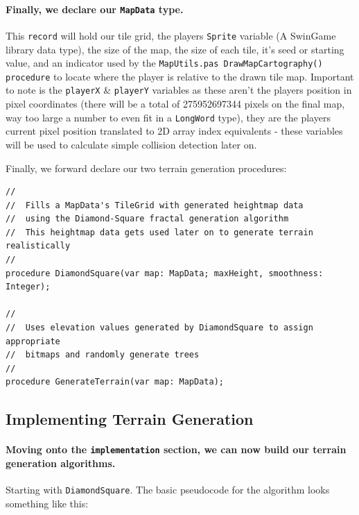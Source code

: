 \documentclass{article}
\begin{document}
\paragraph{Finally, we declare our \texttt{MapData} type.} This \texttt{record} will hold our tile grid, the players \texttt{Sprite} variable (A SwinGame library data type), the size of the map, the size of each tile, it's seed or starting value, and an indicator used by the \texttt{MapUtils.pas DrawMapCartography() procedure} to locate where the player is relative to the drawn tile map. Important to note is the \texttt{playerX} \& \texttt{playerY} variables as these aren't the players position in pixel coordinates (there will be a total of 275952697344 pixels on the final map, way too large a number to even fit in a \texttt{LongWord} type), they are the players current pixel position translated to 2D array index equivalents - these variables will be used to calculate simple collision detection later on.

\vspace{1mm}

Finally, we forward declare our two terrain generation procedures:

\begin{verbatim}
//
//	Fills a MapData's TileGrid with generated heightmap data
//	using the Diamond-Square fractal generation algorithm
//	This heightmap data gets used later on to generate terrain realistically
//
procedure DiamondSquare(var map: MapData; maxHeight, smoothness: Integer);
	
//
//	Uses elevation values generated by DiamondSquare to assign appropriate
//	bitmaps and randomly generate trees
//
procedure GenerateTerrain(var map: MapData);
\end{verbatim}

\subsection{Implementing Terrain Generation}

\paragraph{Moving onto the \texttt{implementation} section, we can now build our terrain generation algorithms.} Starting with \texttt{DiamondSquare}. The basic pseudocode for the algorithm looks something like this:
\end{document}
